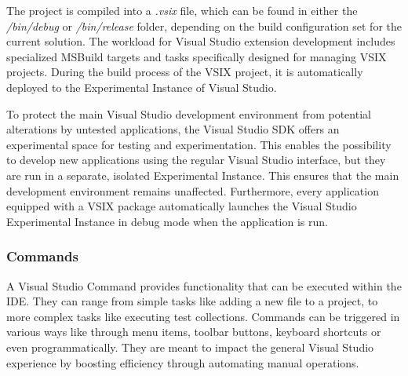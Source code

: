 The project is compiled into a \textit{.vsix} file, which can be found in either the \textit{/bin/debug} or \textit{/bin/release} folder, depending on the build configuration set for the current solution. The workload for Visual Studio extension development includes specialized MSBuild targets and tasks specifically designed for managing VSIX projects. During the build process of the VSIX project, it is automatically deployed to the Experimental Instance of Visual Studio. \citep{vsixCookbook}

To protect the main Visual Studio development environment from potential alterations by untested applications, the Visual Studio SDK offers an experimental space for testing and experimentation. This enables the possibility to develop new applications using the regular Visual Studio interface, but they are run in a separate, isolated Experimental Instance. This ensures that the main development environment remains unaffected. Furthermore, every application equipped with a VSIX package automatically launches the Visual Studio Experimental Instance in debug mode when the application is run.

\subsubsection{Commands}
\label{sssec:VisualStudioCommands}
A Visual Studio Command provides functionality that can be executed within the IDE. They can range from simple tasks like adding a new file to a project, to more complex tasks like executing test collections. Commands can be triggered in various ways like through menu items, toolbar buttons, keyboard shortcuts or even programmatically. They are meant to impact the general Visual Studio experience by boosting efficiency through automating manual operations.

